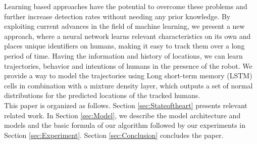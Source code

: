 Learning based approaches have the potential to overcome these problems and further increase detection rates without needing any prior knowledge.
By exploiting current advances in the field of machine learning, we present a new approach, where a neural network learns relevant characteristics on its own and places unique identifiers on humans, making it easy to track them over a long period of time.
Having the information and history of locations, we can learn trajectories, behavior and intentions of humans in the presence of the robot. 
We provide a way to model the trajectories using Long short-term memory (LSTM) cells in combination with a mixture density layer, which outputs a set of normal distributions for the predicted locations of the tracked humans.\\
This paper is organized as follows.
Section \ref{sec:Stateoftheart} presents relevant related work.
In Section \ref{sec:Model}, we describe the model architecture and models and the basic formula of our algorithm followed by our experiments in Section \ref{sec:Experiment}.
Section \ref{sec:Conclusion} concludes the paper.


